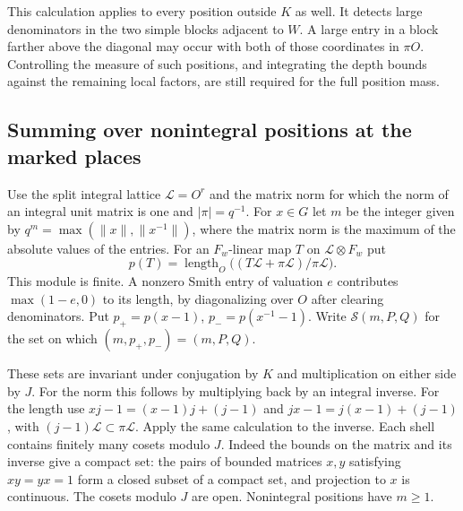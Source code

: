 \documentclass[a4paper,11pt]{article}
\theoremstyle{definition}
\theoremstyle{remark}
\numberwithin{equation}{section}
\begin{document}
This calculation applies to every position outside \(K\) as well.
It detects large denominators in the two simple blocks adjacent
to \(W\). A large entry in a block farther above the diagonal may
occur with both of those coordinates in \(\pi O\). Controlling
the measure of such positions, and integrating the depth bounds
against the remaining local factors, are still required for the
full position mass.
\clearpage

\subsection{Summing over nonintegral positions at the marked places}
\label{sec:nonspheretail884}

Use the split integral lattice \(\mathcal L=O^r\) and the matrix
norm for which the norm of an integral unit matrix is one and
\(|\pi|=q^{-1}\). For \(x\in G\) let \(m\) be the integer given by
\(q^m=\max(\|x\|,\|x^{-1}\|)\), where the matrix norm is the
maximum of the absolute values of the entries. For an \(F_w\)-linear
map \(T\) on \(\mathcal L\otimes F_w\) put
\[
     p(T)=\operatorname{length}_O
                \big((T\mathcal L+\pi\mathcal L)/\pi\mathcal L\big).
\]
This module is finite. A nonzero Smith entry of valuation \(e\)
contributes \(\max(1-e,0)\) to its length, by diagonalizing over
\(O\) after clearing denominators. Put \(p_+=p(x-1)\),
\(p_-=p(x^{-1}-1)\). Write \(\mathcal S(m,P,Q)\) for the set
on which \((m,p_+,p_-)=(m,P,Q)\).

These sets are invariant under conjugation by \(K\) and
multiplication on either side by \(J\). For the norm this follows
by multiplying back by an integral inverse. For the length use
\(xj-1=(x-1)j+(j-1)\) and \(jx-1=j(x-1)+(j-1)\), with
\((j-1)\mathcal L\subset\pi\mathcal L\). Apply the same calculation
to the inverse. Each shell contains finitely many cosets modulo \(J\).
Indeed the bounds on the matrix and its inverse give a compact set:
the pairs of bounded matrices \(x,y\) satisfying \(xy=yx=1\)
form a closed subset of a compact set, and projection to \(x\)
is continuous. The cosets modulo \(J\) are open. Nonintegral
positions have \(m\ge1\).
\end{document}
